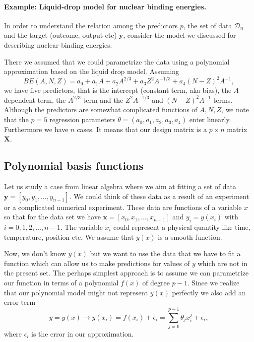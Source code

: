 \documentclass[%
oneside,                 %
final,                   %
10pt]{article}
\newenvironment{block_mdfboxadmon}[1][]{
\begin{block_mdfboxmdframed}[frametitle=#1]
}
{
\end{block_mdfboxmdframed}
}
\begin{document}
\paragraph{Example: Liquid-drop model for nuclear binding energies.}

\begin{block_mdfboxadmon}[]
In order to understand the relation among the predictors $p$, the set of data $\mathcal{D}_n$ and the target (outcome, output etc) $\bm{y}$,
consider the model we discussed for describing nuclear binding energies. 

There we assumed that we could parametrize the data using a polynomial approximation based on the liquid drop model.
Assuming 
\[
BE(A,N,Z) = a_0+a_1A+a_2A^{2/3}+a_3 Z^2 A^{-1/3}+a_4 (N-Z)^2 A^{-1},
\]
we have five predictors, that is the intercept (constant term, aka bias), the $A$ dependent term, the $A^{2/3}$ term and the $Z^2 A^{-1/3}$ and $(N-Z)^2 A^{-1}$ terms. Although the predictors are somewhat complicated functions of $A,N,Z$, we note that the $p=5$ regression parameters $\theta = (a_0, a_1, a_2, a_3, a_4)$ enter linearly. Furthermore we have $n$ cases. It means that our design matrix is a 
$p\times n$ matrix $\bm{X}$.
\end{block_mdfboxadmon} %




\subsection{Polynomial basis functions}

\begin{block_mdfboxadmon}[]
Let us study a case from linear algebra where we aim at fitting a set of data $\bm{y}=[y_0,y_1,\dots,y_{n-1}]$. We could think of these data as a result of an experiment or a complicated numerical experiment. These data are functions of a variable $x$ so that for the data set we have $\bm{x}=[x_0,x_1,\dots,x_{n-1}]$ and $y_i = y(x_i)$ with $i=0,1,2,\dots,n-1$. The variable $x_i$ could represent a physical quantity like time, temperature, position etc. We assume that $y(x)$ is a smooth function. 

Now, we don't know $y(x)$ but we want to use the data that we have to fit a function which can allow us to make predictions for values of $y$ which are not in the present set. The perhaps simplest approach is to assume we can parametrize our function in terms of a polynomial $f(x)$ of degree $p-1$. Since we realize that our polynomial model might not represent $y(x)$ perfectly we also add an error term
\[
y=y(x) \rightarrow y(x_i)=f({x}_i)+\epsilon_i=\sum_{j=0}^{p-1} \theta_j x_i^j+\epsilon_i,
\]
where $\epsilon_i$ is the error in our approximation.
\end{block_mdfboxadmon} %
\end{document}
